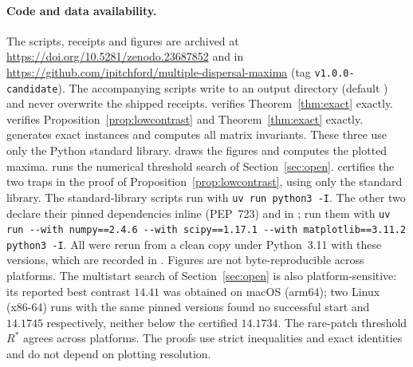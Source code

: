 \documentclass[11pt]{article}
\theoremstyle{remark}
\begin{document}
\paragraph{Code and data availability.} The scripts, receipts and figures are archived at \url{https://doi.org/10.5281/zenodo.23687852} and in \url{https://github.com/ipitchford/multiple-dispersal-maxima} (tag \texttt{v1.0.0-candidate}). The accompanying scripts write to
an output directory (default ) and never overwrite the
shipped receipts.  verifies
Theorem~\ref{thm:exact} exactly.  verifies
Proposition~\ref{prop:lowcontrast} and Theorem~\ref{thm:exact} exactly.
 generates exact instances and computes all
matrix invariants. These three use only the Python standard library.
 draws the figures and computes the plotted
maxima.  runs the numerical threshold search of
Section~\ref{sec:open}.  certifies the two traps
in the proof of Proposition~\ref{prop:lowcontrast}, using only the
standard library. The standard-library scripts run with
\texttt{uv run python3 -I}. The other two declare their pinned
dependencies inline (PEP~723) and in ; run them with
\texttt{uv run -{}-with numpy==2.4.6 -{}-with scipy==1.17.1 -{}-with
matplotlib==3.11.2 python3 -I}. All were rerun from a clean copy under
Python~3.11 with these versions, which are recorded in
. Figures are not byte-reproducible across
platforms. The multistart search of Section~\ref{sec:open} is also
platform-sensitive: its reported best contrast \(14.41\) was obtained on macOS
(arm64); two Linux (x86-64) runs with the same pinned versions found no
successful start and \(14.1745\) respectively, neither below the certified \(14.1734\). The
rare-patch threshold \(R^*\) agrees across platforms. The proofs use strict inequalities and exact identities and do
not depend on plotting resolution.
\end{document}
